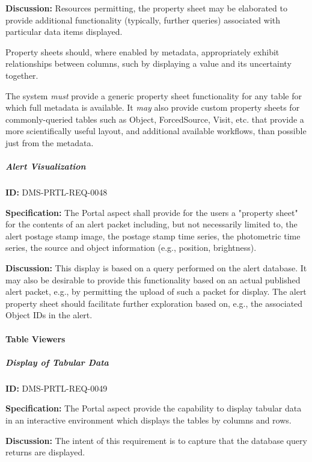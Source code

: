 \documentclass[SE,toc,lsstdraft]{lsstdoc}
\begin{document}
\textbf{Discussion:}
Resources permitting, the property sheet may be elaborated to provide additional functionality (typically, further queries) associated with particular data items displayed.

Property sheets should, where enabled by metadata, appropriately exhibit relationships between columns, such by displaying a value and its uncertainty together.

The system \textit{must} provide a generic property sheet functionality for any table for which full metadata is available. It \textit{may} also provide custom property sheets for commonly-queried tables such as Object, ForcedSource, Visit, etc. that provide a more scientifically useful layout, and additional available workflows, than possible just from the metadata.

\subparagraph{Alert Visualization}\hfill  %

\label{DMS-PRTL-REQ-0048}
\textbf{ID:} DMS-PRTL-REQ-0048

\textbf{Specification:}
The Portal aspect shall provide for the users a "property sheet" for the contents of an alert packet including, but not necessarily limited to, the alert postage stamp image, the postage stamp time series, the photometric time series, the source and object information (e.g., position, brightness).

\textbf{Discussion:}
This display is based on a query performed on the alert database.  It may also be desirable to provide this functionality based on an actual published alert packet, e.g., by permitting the upload of such a packet for display.
The alert property sheet should facilitate further exploration based on, e.g., the associated Object IDs in the alert.

\paragraph{Table Viewers}\hfill  %

\subparagraph{Display of Tabular Data}\hfill  %

\label{DMS-PRTL-REQ-0049}
\textbf{ID:} DMS-PRTL-REQ-0049

\textbf{Specification:}
The Portal aspect provide the capability to display tabular data in an interactive environment which displays the tables by columns and rows.

\textbf{Discussion:}
The intent of this requirement is to capture that the database query returns are displayed.
\end{document}
